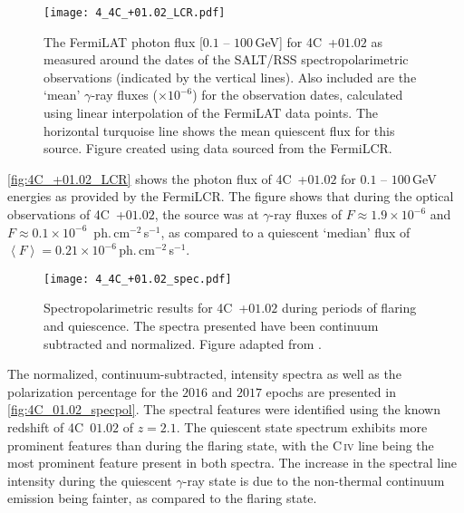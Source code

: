 \begin{figure}[t]
    \centering
    \texttt{[image: 4\_4C\_+01.02\_LCR.pdf]}
    \caption{
        The \gls{FermiLAT} photon flux [$0.1$ -- $100$\,GeV] for 4C~+$01.02$ as measured around the dates of the \gls{SALT}/\gls{RSS} spectropolarimetric observations (indicated by the vertical lines).
        Also included are the `mean' $\gamma$-ray fluxes ($\times 10^{-6}$) for the observation dates, calculated using linear interpolation of the \gls{FermiLAT} data points.
        The horizontal turquoise line shows the mean quiescent flux for this source.
        Figure created using data sourced from the \gls{FermiLCR}.\protect\footnotemark
    }
    \label{fig:4C_+01.02_LCR}
\end{figure}

\autoref{fig:4C_+01.02_LCR} shows the photon flux of 4C~+$01.02$ for $0.1$ -- $100$\,GeV energies as provided by the \gls{FermiLCR}.
The figure shows that during the optical observations of 4C~+$01.02$, the source was at $\gamma$-ray fluxes of $F \approx 1.9 \times 10^{-6}$ and $F \approx 0.1 \times 10^{-6}$~ph.\,cm$^{-2}$\,s$^{-1}$, as compared to a quiescent `median' flux of $\left\langle F \right\rangle = 0.21 \times 10^{-6}$\,ph.\,cm$^{-2}$\,s$^{-1}$.

\begin{figure}[t]
    \centering
    \texttt{[image: 4\_4C\_+01.02\_spec.pdf]}
    \caption{
        Spectropolarimetric results for 4C~+$01.02$ during periods of flaring and quiescence.
        The spectra presented have been continuum subtracted and normalized.
        Figure adapted from \citep{Schutte4C0102}.
    }
    \label{fig:4C_01.02_specpol}
\end{figure}


The normalized, continuum-subtracted, intensity spectra as well as the polarization percentage for the $2016$ and $2017$ epochs are presented in \autoref{fig:4C_01.02_specpol}.
The spectral features were identified using the known redshift of 4C~$01.02$ of $z = 2.1$.
The quiescent state spectrum exhibits more prominent features than during the flaring state, with the C\,\textsc{iv} line being the most prominent feature present in both spectra.
The increase in the spectral line intensity during the quiescent $\gamma$-ray state is due to the non-thermal continuum emission being fainter, as compared to the flaring state.

